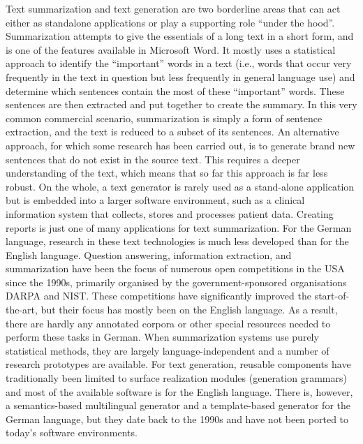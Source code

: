 \documentclass[]{../../metanetpaper}
\begin{document}
\begin{Parallel}[c]{80mm}{80mm}
{    Text summarization and text generation are two borderline areas that can act either as standalone applications or play a supporting role “under the hood”. Summarization attempts to give the essentials of a long text in a short form, and is one of the features available in Microsoft Word. It mostly uses a statistical approach to identify the “important” words in a text (i.e., words that occur very frequently in the text in question but less frequently in general language use) and determine which sentences contain the most of these “important” words. These sentences are then extracted and put together to create the summary. In this very common commercial scenario, summarization is simply a form of sentence extraction, and the text is reduced to a subset of its sentences. An alternative approach, for which some research has been carried out, is to generate brand new sentences that do not exist in the source text. This requires a deeper understanding of the text, which means that so far this approach is far less robust. On the whole, a text generator is rarely used as a stand-alone application but is embedded into a larger software environment, such as a clinical information system that collects, stores and processes patient data. Creating reports is just one of many applications for text summarization. 
For the German language, research in these text technologies is much less developed than for the English language. Question answering, information extraction, and summarization have been the focus of numerous open competitions in the USA since the 1990s, primarily organised by the government-sponsored organisations DARPA and NIST. These competitions have significantly improved the start-of-the-art, but their focus has mostly been on the English language. As a result, there are hardly any annotated corpora or other special resources needed to perform these tasks in German. When summarization systems use purely statistical methods, they are largely language-independent and a number of research prototypes are available. For text generation, reusable components have traditionally been limited to surface realization modules (generation grammars) and most of the available software is for the English language. There is, however, a semantics-based multilingual generator and a template-based generator for the German language, but they date back to the 1990s and have not been ported to today’s software environments.
  }
  

\end{Parallel}
\end{document}
